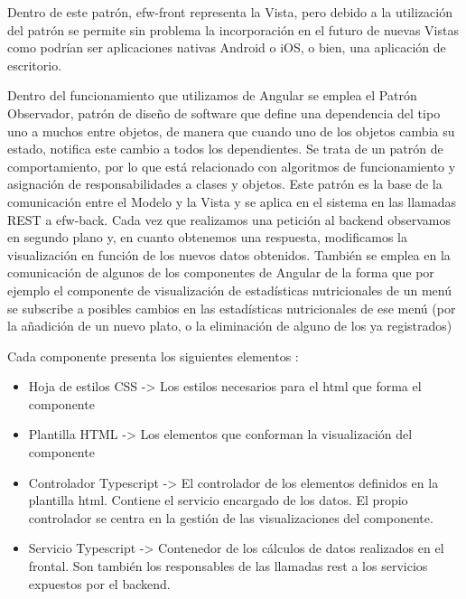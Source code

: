 \documentclass[12pt, a4paper, twoside]{book}
\let\>\textgreater
\begin{document}
	Dentro de este patrón, efw-front representa la Vista, pero debido a la utilización del patrón se permite sin problema la incorporación en el futuro de nuevas Vistas como podrían ser aplicaciones nativas Android o iOS, o bien, una aplicación de escritorio.
	
	Dentro del funcionamiento que utilizamos de Angular se emplea el Patrón Observador, patrón de diseño de software que define una dependencia del tipo uno a muchos entre objetos, de manera que cuando uno de los objetos cambia su estado, notifica este cambio a todos los dependientes. Se trata de un patrón de comportamiento, por lo que está relacionado con algoritmos de funcionamiento y asignación de responsabilidades a clases y objetos. Este patrón es la base de la comunicación entre el Modelo y la Vista y se aplica en el sistema en las llamadas REST a efw-back. Cada vez que realizamos una petición al backend observamos en segundo plano y, en cuanto obtenemos una respuesta, modificamos la visualización en función de los nuevos datos obtenidos. También se emplea en la comunicación de algunos de los componentes de Angular de la forma que por ejemplo el componente de visualización de estadísticas nutricionales de un menú se subscribe a posibles cambios en las estadísticas nutricionales de ese menú (por la añadición de un nuevo plato, o la eliminación de alguno de los ya registrados)
	
	Cada componente presenta los siguientes elementos : 
	\begin{itemize}
		\item Hoja de estilos CSS -\> Los estilos necesarios para el html que forma el componente
		\item Plantilla HTML -\> Los elementos que conforman la visualización del componente
		\item Controlador Typescript -\> El controlador de los elementos definidos en la plantilla html. Contiene el servicio encargado de los datos. El propio controlador se centra en la gestión de las visualizaciones del componente.
		\item Servicio Typescript -\> Contenedor de los cálculos de datos realizados en el frontal. Son también los responsables de las llamadas rest a los servicios expuestos por el backend.
	\end{itemize}
\end{document}
